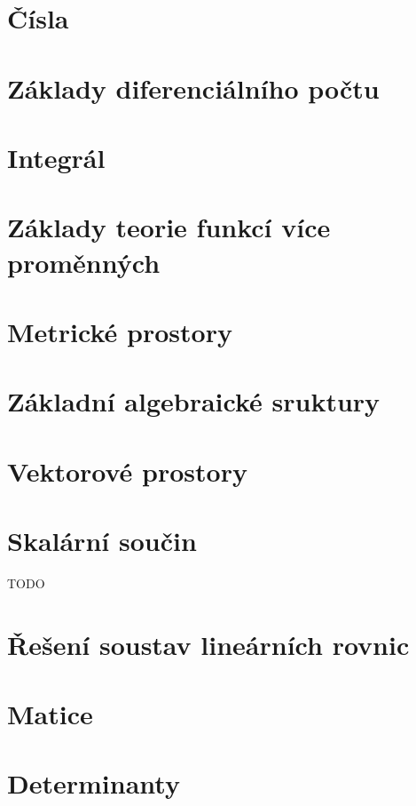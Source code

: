 


\section{Čísla}


\section{Základy diferenciálního počtu}


\section{Integrál}


\section{Základy teorie funkcí více proměnných}


\section{Metrické prostory}


\section{Základní algebraické sruktury}


\section{Vektorové prostory}


\section{Skalární součin}
TODO

\section{Řešení soustav lineárních rovnic}


\section{Matice}


\section{Determinanty}



